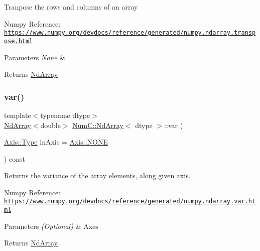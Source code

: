 Tranpose the rows and columns of an array

Numpy Reference\+: \href{https://www.numpy.org/devdocs/reference/generated/numpy.ndarray.transpose.html}{\tt https\+://www.\+numpy.\+org/devdocs/reference/generated/numpy.\+ndarray.\+transpose.\+html}


\begin{DoxyParams}{Parameters}
{\em None} & \\
\hline
\end{DoxyParams}
\begin{DoxyReturn}{Returns}
\mbox{\hyperlink{class_num_c_1_1_nd_array}{Nd\+Array}} 
\end{DoxyReturn}
\mbox{\label{class_num_c_1_1_nd_array_a5b56db8e1e80782412cee85c277ca614}} 
\subsubsection{\texorpdfstring{var()}{var()}}
{\footnotesize\ttfamily template$<$typename dtype$>$ \\
\mbox{\hyperlink{class_num_c_1_1_nd_array}{Nd\+Array}}$<$double$>$ \mbox{\hyperlink{class_num_c_1_1_nd_array}{Num\+C\+::\+Nd\+Array}}$<$ dtype $>$\+::var (\begin{DoxyParamCaption}\item[{\mbox{\hyperlink{struct_num_c_1_1_axis_a8e689044ef1941a03482e730c5e7ebb3}{Axis\+::\+Type}}}]{in\+Axis = {\ttfamily \mbox{\hyperlink{struct_num_c_1_1_axis_a8e689044ef1941a03482e730c5e7ebb3a0ae033c4226f7184bf0050b101e7ed94}{Axis\+::\+N\+O\+NE}}} }\end{DoxyParamCaption}) const\hspace{0.3cm}{\ttfamily [inline]}}

Returns the variance of the array elements, along given axis.

Numpy Reference\+: \href{https://www.numpy.org/devdocs/reference/generated/numpy.ndarray.var.html}{\tt https\+://www.\+numpy.\+org/devdocs/reference/generated/numpy.\+ndarray.\+var.\+html}


\begin{DoxyParams}{Parameters}
{\em (\+Optional)} & Axes \\
\hline
\end{DoxyParams}
\begin{DoxyReturn}{Returns}
\mbox{\hyperlink{class_num_c_1_1_nd_array}{Nd\+Array}} 
\end{DoxyReturn}
\mbox{\label{class_num_c_1_1_nd_array_ac5a6ca9e5aed16a5dc6ea3965f96124c}} 
